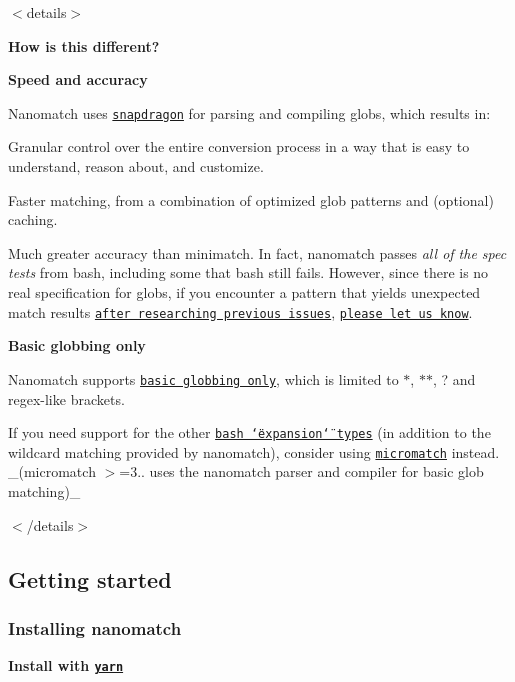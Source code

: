 $<$details$>$ 

{\bfseries How is this different?}

{\bfseries Speed and accuracy}

Nanomatch uses \href{https://github.com/jonschlinkert/snapdragon}{\tt snapdragon} for parsing and compiling globs, which results in\+:


\begin{DoxyItemize}
\item Granular control over the entire conversion process in a way that is easy to understand, reason about, and customize.
\item Faster matching, from a combination of optimized glob patterns and (optional) caching.
\item Much greater accuracy than minimatch. In fact, nanomatch passes {\itshape all of the spec tests} from bash, including some that bash still fails. However, since there is no real specification for globs, if you encounter a pattern that yields unexpected match results \href{../../issues}{\tt after researching previous issues}, \href{../../issues/new}{\tt please let us know}.
\end{DoxyItemize}

{\bfseries Basic globbing only}

Nanomatch supports \href{#features}{\tt basic globbing only}, which is limited to {\ttfamily $\ast$}, {\ttfamily $\ast$$\ast$}, {\ttfamily ?} and regex-\/like brackets.

If you need support for the other \href{#bash-expansion-libs}{\tt bash \char`\"{}expansion\char`\"{} types} (in addition to the wildcard matching provided by nanomatch), consider using \href{https://github.com/micromatch/micromatch}{\tt micromatch} instead. \+\_\+(micromatch $>$=3.. uses the nanomatch parser and compiler for basic glob matching)\+\_\+

$<$/details$>$

\subsection*{Getting started}

\subsubsection*{Installing nanomatch}

{\bfseries Install with \href{https://yarnpkg.com/}{\tt yarn}}




